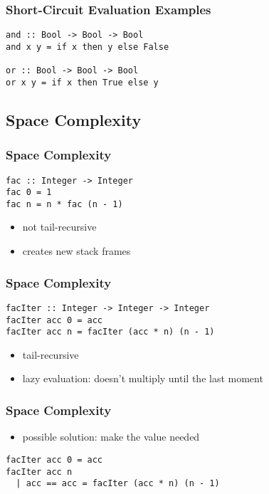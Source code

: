 \documentclass[dvipsnames]{beamer}
\theoremstyle{plain}
\begin{document}
\begin{frame}[fragile]
  \frametitle{Short-Circuit Evaluation Examples}

  \begin{lstlisting}[deletekeywords={and,not,or}]
and :: Bool -> Bool -> Bool
and x y = if x then y else False

or :: Bool -> Bool -> Bool
or x y = if x then True else y
  \end{lstlisting}
\end{frame}

\subsection{Space Complexity}

\begin{frame}[fragile]
  \frametitle{Space Complexity}

  \begin{exampleblock}{}
    \begin{lstlisting}
fac :: Integer -> Integer
fac 0 = 1
fac n = n * fac (n - 1)
    \end{lstlisting}
  \end{exampleblock}

  \begin{itemize}
    \item not tail-recursive
    \item creates new stack frames
  \end{itemize}
\end{frame}

\begin{frame}[fragile]
  \frametitle{Space Complexity}

  \begin{exampleblock}{}
    \begin{lstlisting}
facIter :: Integer -> Integer -> Integer
facIter acc 0 = acc
facIter acc n = facIter (acc * n) (n - 1)
    \end{lstlisting}
  \end{exampleblock}

  \begin{itemize}
    \item tail-recursive
    \item lazy evaluation: doesn't multiply until the last moment
  \end{itemize}
\end{frame}

\begin{frame}[fragile]
  \frametitle{Space Complexity}

  \begin{itemize}
    \item possible solution: make the value needed
  \end{itemize}

  \begin{exampleblock}{}
    \begin{lstlisting}
facIter acc 0 = acc
facIter acc n
  | acc == acc = facIter (acc * n) (n - 1)
    \end{lstlisting}
  \end{exampleblock}
\end{frame}
\end{document}
